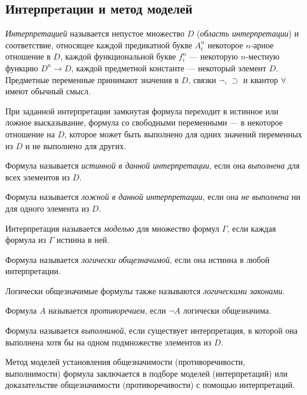 \subsection{Интерпретации и метод моделей}
\begin{definition*}
    \textit{Интерпретацией} называется непустое множество $D$ (\textit{область интерпретации}) и соответствие, относящее каждой предикатной букве $A_i^n$ некоторое $n$-арное отношение в $D$, каждой функциональной букве $f_i^n$ --- некоторую $n$-местную функцию $D^n \to D$, каждой предметной константе --- некоторый элемент $D$. Предметные переменные принимают значения в $D$, связки $\neg$, $\supset$ и квантор $\forall$ имеют обычный смысл.
\end{definition*}
При заданной интерпретации замкнутая формула переходит в истинное или ложное высказывание, формула со свободными переменными --- в некоторое отношение на $D$, которое может быть выполнено для одних значений переменных из $D$ и не выполнено для других.
\begin{definition*}
    Формула называется \textit{истинной в данной интерпретации}, если она \textit{выполнена} для всех элементов из $D$.
\end{definition*}
\begin{definition*}
    Формула называется \textit{ложной в данной интерпретации}, если она \textit{не выполнена} ни для одного элемента из $D$.
\end{definition*}
\begin{definition*}
    Интерпретация называется \textit{моделью} для множество формул $\Gamma$, если каждая формула из $\Gamma$ истинна в ней.
\end{definition*}
\begin{definition*}
    Формула называется \textit{логически общезначимой}, если она истинна в любой интерпретации.
\end{definition*}
Логически общезначимые формулы также называются \textit{логическими законами}.
\begin{definition*}
    Формула $A$ называется \textit{противоречием}, если $\neg A$ логически общезначима.
\end{definition*}
\begin{definition*}
    Формула называется \textit{выполнимой}, если существует интерпретация, в которой она выполнена хотя бы на одном подмножестве элементов из $D$.
\end{definition*}
Метод моделей установления общезначимости (противоречивости, выполнимости) формула заключается в подборе моделей (интерпретаций) или доказательстве общезначимости (противоречивости) с помощью интерпретаций.